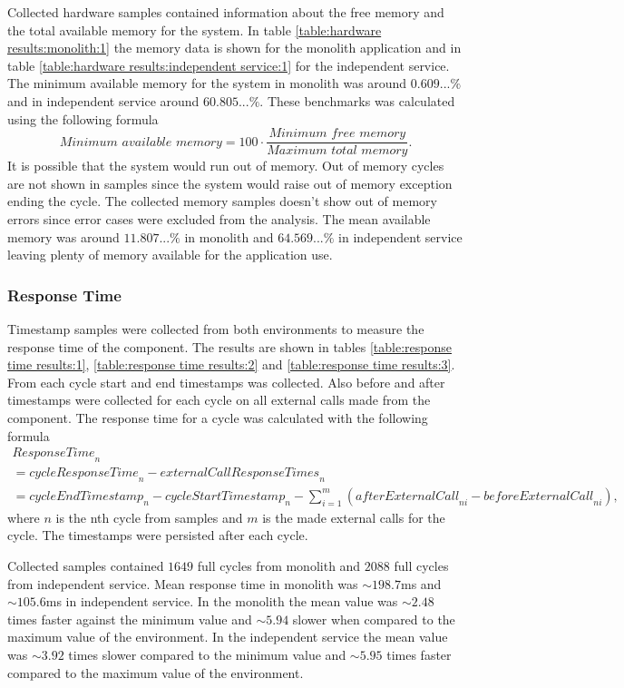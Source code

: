 Collected hardware samples contained information about the free memory and the total available memory for the system.
In table \ref{table:hardware results:monolith:1} the memory data is shown for the monolith application and in table \ref{table:hardware results:independent service:1} for the independent service.
The minimum available memory for the system in monolith was around $0.609...\%$ and in independent service around $60.805...\%$.
These benchmarks was calculated using the following formula
\[
\textit{Minimum available memory} = 100 \cdot \frac{\textit{Minimum free memory}}{\textit{Maximum total memory}}
.\]
It is possible that the system would run out of memory.
Out of memory cycles are not shown in samples since the system would raise out of memory exception ending the cycle.
The collected memory samples doesn't show out of memory errors since error cases were excluded from the analysis.
The mean available memory was around $11.807...\%$ in monolith and $64.569...\%$ in independent service leaving plenty of memory available for the application use.

\subsubsection{Response Time}
Timestamp samples were collected from both environments to measure the response time of the component.
The results are shown in tables \ref{table:response time results:1}, \ref{table:response time results:2} and \ref{table:response time results:3}.
From each cycle start and end timestamps was collected.
Also before and after timestamps were collected for each cycle on all external calls made from the component.
The response time for a cycle was calculated with the following formula
\begin{gather*}
\textit{ResponseTime}_n
\\ =\textit{cycleResponseTime}_n - \textit{externalCallResponseTimes}_n
\\ = \textit{cycleEndTimestamp}_n - \textit{cycleStartTimestamp}_n - 
    \sum_{i=1}^{\textit{m}} (\textit{afterExternalCall}_{ni} -     \textit{beforeExternalCall}_{ni}),
\end{gather*}
where $n$ is the nth cycle from samples and $m$ is the made external calls for the cycle.
The timestamps were persisted after each cycle.

Collected samples contained $1649$ full cycles from monolith and $2088$ full cycles from independent service.
Mean response time in monolith was $\sim198.7$ms and $\sim105.6$ms in independent service.
In the monolith the mean value was $\sim2.48$ times faster against the minimum value and $\sim5.94$ slower when compared to the maximum value of the environment.
In the independent service the mean value was $\sim3.92$ times slower compared to the minimum value and $\sim5.95$ times faster compared to the maximum value of the environment.

